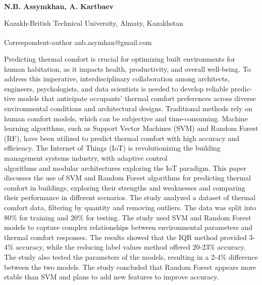 
\begin{articleheader}

{\bfseries N.B. Assymkhan\textsuperscript{\envelope }, A. Kartbaev}
\end{articleheader}

\begin{affiliation}
Kazakh-British Technical University, Almaty, Kazakhstan

\raggedright {\bfseries \textsuperscript{\envelope }}Correspondent-author anb.asymhan@gmail.com
\end{affiliation}

Predicting thermal comfort is crucial for optimizing built environments
for human habitation, as it impacts health, productivity, and overall
well-being. To address this imperative, interdisciplinary colla\-boration
among architects, engineers, psychologists, and data scientists is
needed to develop reliable predic-tive models that anticipate occupants'
thermal comfort preferences across diverse environmental conditions and
architectural designs. Traditional methods rely on human comfort models,
which can be subjective and time-consuming. Machine learning algorithms,
such as Support Vector Machines (SVM) and Random Forest (RF), have been
utilized to predict thermal comfort with high accuracy and efficiency.
The Internet of Things (IoT) is revolutionizing the building management
systems industry, with adaptive control \\algorithms and modular
architectures exploring the IoT paradigm. This paper discusses the use
of SVM and Random Forest algorithms for predicting thermal comfort in
buildings, exploring their strengths and weaknesses and comparing their
performance in different scenarios. The study analyzed a dataset of
thermal comfort data, filtering by quantity and removing outliers. The
data was split into 80\% for training and 20\% for testing. The study
used SVM and Random Forest models to capture complex relationships
between environmental parameters and thermal comfort responses. The
results showed that the IQR method provided 3-4\% accuracy, while the
reducing label values method offered 20-23\% accuracy. The study also
tested the parameters of the models, resulting in a 2-4\% difference
between the two models. The study concluded that Random Forest appears
more stable than SVM and plans to add new features to improve accuracy.

